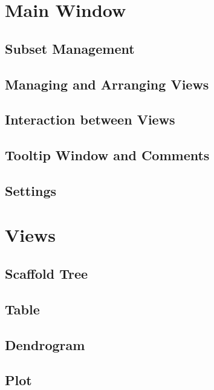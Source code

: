 \documentclass[a4paper,10pt,english,twoside,bibliography=totoc,listof=totoc]{scrbook}
\begin{document}
\chapter{Main Window}
    
  \section{Subset Management} \label{sec:scaffoldhunter:subsetmanagement}
    
  \section{Managing and Arranging Views} \label{sec:scaffoldhunter:viewmanagement}
    
  \section{Interaction between Views}
  	
  \section{Tooltip Window and Comments}
    
  \section{Settings}
    

\chapter{Views} \label{sec:scaffoldhunter:views}
	
  \section{Scaffold Tree}
    
  \section{Table} \label{sec:scaffoldhunter:table}
    
  \section{Dendrogram}\label{sec:views:dendogram}
    
  \section{Plot}
    
\end{document}
